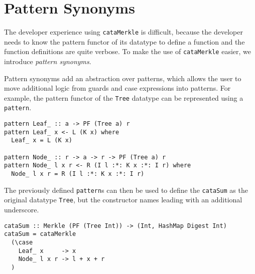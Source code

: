 \section{Pattern Synonyms}
\label{sec-patt-syn}

The developer experience using \texttt{cataMerkle} is difficult, because the developer needs to know the pattern functor of its datatype to define a function and the function definitions are quite verbose. To make the use of \texttt{cataMerkle} easier, we introduce \textit{pattern synonyms}\cite{pickering2016pattern}. 

Pattern synonyms add an abstraction over patterns, which allows the user to move additional logic from guards and case expressions into patterns. For example, the pattern functor of the \texttt{Tree} datatype can be represented using a \texttt{pattern}.

\begin{verbatim}
pattern Leaf_ :: a -> PF (Tree a) r
pattern Leaf_ x <- L (K x) where
  Leaf_ x = L (K x)

pattern Node_ :: r -> a -> r -> PF (Tree a) r
pattern Node_ l x r <- R (I l :*: K x :*: I r) where
  Node_ l x r = R (I l :*: K x :*: I r)
\end{verbatim}

The previously defined \texttt{pattern}s can then be used to define the \texttt{cataSum} as the original datatype \texttt{Tree}, but the constructor names leading with an additional underscore. 

\begin{verbatim}
cataSum :: Merkle (PF (Tree Int)) -> (Int, HashMap Digest Int)
cataSum = cataMerkle
  (\case
    Leaf_ x     -> x
    Node_ l x r -> l + x + r
  )
\end{verbatim}